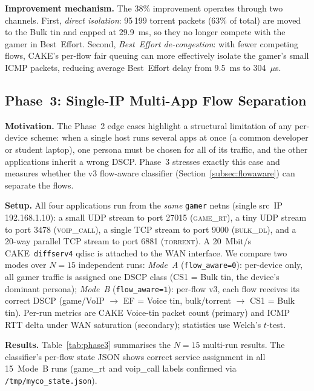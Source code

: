 \documentclass[conference]{IEEEtran}
\begin{document}
\textbf{Improvement mechanism.}
The 38\% improvement operates through two channels.
First, \emph{direct isolation}: 95\,199 torrent packets (63\% of total)
are moved to the Bulk tin and capped at 29.9~ms, so they no longer compete
with the gamer in Best~Effort.
Second, \emph{Best~Effort de-congestion}: with fewer competing flows,
CAKE's per-flow fair queuing can more effectively isolate the gamer's
small ICMP packets, reducing average Best~Effort delay from 9.5~ms to 304~$\mu$s.

\subsection{Phase~3: Single-IP Multi-App Flow Separation}
\label{subsec:phase3}

\textbf{Motivation.}
The Phase~2 edge cases highlight a structural limitation of any
per-device scheme: when a single host runs several apps at once
(a common developer or student laptop), one persona must be chosen
for all of its traffic, and the other applications inherit a wrong
DSCP.
Phase~3 stresses exactly this case and measures whether the v3
flow-aware classifier (Section~\ref{subsec:flowaware}) can separate
the flows.

\textbf{Setup.}
All four applications run from the \emph{same} \texttt{gamer} netns
(single src~IP 192.168.1.10):
a small UDP stream to port 27015 (\textsc{game\_rt}),
a tiny UDP stream to port 3478 (\textsc{voip\_call}),
a single TCP stream to port 9000 (\textsc{bulk\_dl}),
and a 20-way parallel TCP stream to port 6881 (\textsc{torrent}).
A 20~Mbit/s CAKE~\texttt{diffserv4} qdisc is attached to the WAN interface.
We compare two modes over \textbf{$N=15$} independent runs:
\emph{Mode~A} (\texttt{flow\_aware=0}): per-device only, all gamer
traffic is assigned one DSCP class (CS1 = Bulk tin, the device's
dominant persona); \emph{Mode~B} (\texttt{flow\_aware=1}): per-flow
v3, each flow receives its correct DSCP (game/VoIP $\to$ EF = Voice tin,
bulk/torrent $\to$ CS1 = Bulk tin).
Per-run metrics are CAKE Voice-tin packet count (primary) and ICMP RTT delta
under WAN saturation (secondary); statistics use Welch's $t$-test.

\textbf{Results.}
Table~\ref{tab:phase3} summarises the $N{=}15$ multi-run results.
The classifier's per-flow state JSON shows correct service assignment in
all 15~Mode~B runs (game\_rt and voip\_call labels confirmed via
\texttt{/tmp/myco\_state.json}).
\end{document}
